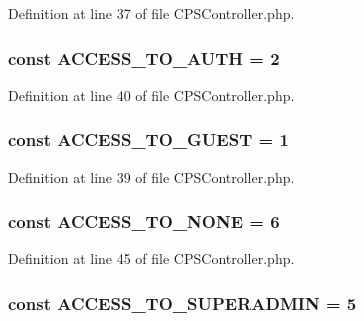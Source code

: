 Definition at line 37 of file CPSController.php.

\hypertarget{classCPSController_a437b41cb9e13e41157d57e7736366295}{
\subsubsection[{ACCESS\_\-TO\_\-AUTH}]{\setlength{\rightskip}{0pt plus 5cm}const {\bf ACCESS\_\-TO\_\-AUTH} = 2}}
\label{classCPSController_a437b41cb9e13e41157d57e7736366295}


Definition at line 40 of file CPSController.php.

\hypertarget{classCPSController_aaef8a39bfe4d39dca0f45fdb837a8d59}{
\subsubsection[{ACCESS\_\-TO\_\-GUEST}]{\setlength{\rightskip}{0pt plus 5cm}const {\bf ACCESS\_\-TO\_\-GUEST} = 1}}
\label{classCPSController_aaef8a39bfe4d39dca0f45fdb837a8d59}


Definition at line 39 of file CPSController.php.

\hypertarget{classCPSController_a63d56389fe1e58d0b097471ca4f4dc00}{
\subsubsection[{ACCESS\_\-TO\_\-NONE}]{\setlength{\rightskip}{0pt plus 5cm}const {\bf ACCESS\_\-TO\_\-NONE} = 6}}
\label{classCPSController_a63d56389fe1e58d0b097471ca4f4dc00}


Definition at line 45 of file CPSController.php.

\hypertarget{classCPSController_a91cdb5f485c387235bfbd09b1bb132bb}{
\subsubsection[{ACCESS\_\-TO\_\-SUPERADMIN}]{\setlength{\rightskip}{0pt plus 5cm}const {\bf ACCESS\_\-TO\_\-SUPERADMIN} = 5}}
\label{classCPSController_a91cdb5f485c387235bfbd09b1bb132bb}


